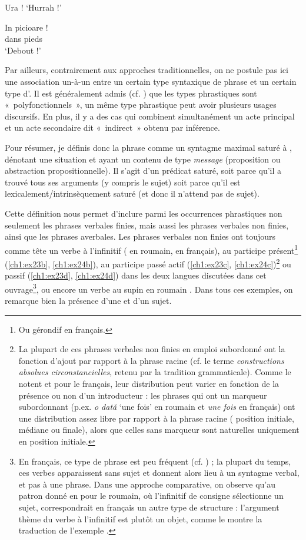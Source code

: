 \ea \label{ch1:ex22}
\ea  Ura ! \label{ch1:ex22a}
\glt ‘Hurrah !’ 

\ex
\gll   In  picioare ! \label{ch1:ex22b}\\
    dans  pieds\\
\glt ‘Debout !’ 
\z
\z

Par ailleurs, contrairement aux approches traditionnelles, on ne postule pas ici une association un-à-un entre un certain type syntaxique de phrase et un certain type d’. Il est généralement admis (cf. \citealt{Gazdar1981}) que les types phrastiques sont «~polyfonctionnels~», {\cad} un même type phrastique peut avoir plusieurs usages discursifs. En plus, il y a des cas qui combinent simultanément un acte principal et un acte secondaire dit «~indirect~» obtenu par inférence.

Pour résumer, je définis donc la phrase comme un syntagme maximal saturé à , dénotant une situation et ayant un contenu de type \textit{message} (proposition ou abstraction propositionnelle). Il s’agit d’un prédicat saturé, soit parce qu’il a trouvé tous ses arguments (y compris le sujet) soit parce qu’il est lexicalement/intrinsèquement saturé (et donc il n’attend pas de sujet). 

Cette définition nous permet d’inclure parmi les occurrences phrastiques non seulement les phrases verbales finies, mais aussi les phrases verbales non finies, ainsi que les phrases averbales. Les phrases verbales non finies ont toujours comme tête un verbe à l’infinitif ( en roumain,  en français), au participe présent\footnote{Ou gérondif en français.} (\ref{ch1:ex23b}, \ref{ch1:ex24b}), au participe passé actif (\ref{ch1:ex23c}, \ref{ch1:ex24c})\footnote{La plupart de ces phrases verbales non finies en emploi subordonné ont la fonction d’ajout par rapport à la phrase racine (cf. le terme \textit{constructions absolues circonstancielles}, retenu par la tradition grammaticale). Comme le notent \citet{Laurens2007} et \citet{Mouret2011} pour le français, leur distribution peut varier en fonction de la présence ou non d’un introducteur : les phrases qui ont un marqueur subordonnant (p.ex. \textit{o dată} ‘une fois’ en roumain et \textit{une fois} en français) ont une distribution assez libre par rapport à la phrase racine ({\cad} position initiale, médiane ou finale), alors que celles sans marqueur sont naturelles uniquement en position initiale.} ou passif (\ref{ch1:ex23d}, \ref{ch1:ex24d}) dans les deux langues discutées dans cet ouvrage\footnote{En français, ce type de phrase est peu fréquent (cf. \citealt{GGFToAppear}) ; la plupart du temps, ces verbes apparaissent sans sujet et donnent alors lieu à un syntagme verbal, et pas à une phrase. Dans une approche comparative, on observe qu’au patron donné en  pour le roumain, où l’infinitif de consigne sélectionne un sujet, correspondrait en français un autre type de structure : l’argument thème du verbe à l’infinitif est plutôt un objet, comme le montre la traduction de l’exemple .}, ou encore un verbe au supin en roumain . Dans tous ces exemples, on remarque bien la présence d’une  et d’un sujet.

